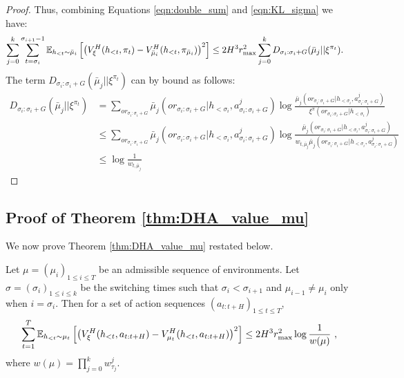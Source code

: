 \begin{proof}
        Thus, combining Equations \ref{eqn:double_sum} and \ref{eqn:KL_sigma} we have:
        \begin{align*}
            \sum_{j=0}^{k} \sum_{t=\sigma_i}^{\sigma_{i+1}-1} \mathbb{E}_{h_{<t} \sim \bar{\mu}_i} \left[ \left( V_{\xi}^{H}(h_{<t}, \pi_t) - V_{\bar{\mu}_i}^{H}(h_{<t}, \pi_{\bar{\mu}_i}) \right)^2 \right] &\leq 2 H^3 r_{\max}^2 \sum_{j=0}^{k} D_{\sigma_i: \sigma_i + G} (\bar{\mu}_j || \xi^{\pi_t}). \label{eqn:KL_sigma}
        \end{align*}
        The term $D_{\sigma_i: \sigma_i + G} (\bar{\mu}_j || \xi^{\pi_t})$ can by bound as follows:
        \begin{align*}
            D_{\sigma_i: \sigma_i + G} (\bar{\mu}_j || \xi^{\pi_t}) &= \sum_{or_{\sigma_i: \sigma_i + G}} \bar{\mu}_j(or_{\sigma_i: \sigma_i + G} | h_{<\sigma_i}, a^j_{\sigma_i: \sigma_i + G}) \log \frac{ \bar{\mu}_j(or_{\sigma_i: \sigma_i + G} | h_{<\sigma_i}, a^j_{\sigma_i: \sigma_i + G}) }{ \xi^{\pi}(or_{\sigma_i: \sigma_i + G} | h_{<\sigma_i}) }\\
            &\leq \sum_{or_{\sigma_i: \sigma_i + G}} \bar{\mu}_j(or_{\sigma_i: \sigma_i + G} | h_{<\sigma_i}, a^j_{\sigma_i: \sigma_i + G}) \log \frac{ \bar{\mu}_j(or_{\sigma_i: \sigma_i + G} | h_{<\sigma_i}, a^j_{\sigma_i: \sigma_i + G}) }{ w_{t, \bar{\mu}_j} \bar{\mu}_j(or_{\sigma_i: \sigma_i + G} | h_{<\sigma_i}, a^j_{\sigma_i: \sigma_i + G}) }\\
            &\leq \log \frac{1}{w_{t, \bar{\mu}_j}}
        \end{align*}
    \end{proof}
    
    
    
    
    
    
    
    
    
    
    
    
    
    
    
    
    \newpage
    
    \subsection{Proof of Theorem \ref{thm:DHA_value_mu}}
    We now prove Theorem \ref{thm:DHA_value_mu} restated below.
    \begin{T1}
        Let $\mu = (\mu_i)_{1 \leq i \leq T}$ be an admissible sequence of environments. Let $\sigma = (\sigma_i)_{1 \leq i \leq k}$ be the switching times such that $\sigma_i < \sigma_{i+1}$ and $\mu_{i-1} \neq \mu_{i}$ only when $i = \sigma_{i}$. Then for a set of action sequences $(a_{t:t+H})_{1\leq t \leq T}$,
        \begin{align}
            \sum_{t=1}^{T} \mathbb{E}_{h_{<t} \sim \mu_t} \left[ \left( V_{\xi}^{H}(h_{<t}, a_{t:t+H}) - V_{\mu_{t}}^{H}(h_{<t}, a_{t:t+H}) \right)^2 \right] \leq 2 H^3 r_{\max}^2 \log \frac{1}{w(\mu)}~,
        \end{align}
        where $w(\mu) = \prod_{j=0}^{k} w_{\tau_j}^j$. 
    \end{T1}
    
